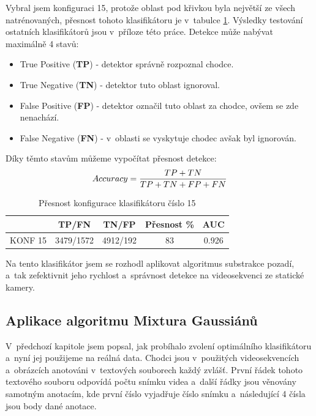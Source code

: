 Vybral jsem konfiguraci 15, protože oblast pod křivkou byla největší ze všech natrénovaných, přesnost tohoto klasifikátoru je v~tabulce \ref{classTab2}. Výsledky testování ostatních klasifikátorů jsou v~příloze této práce. Detekce může nabývat maximálně 4 stavů:
\begin{itemize}
	\item{True Positive (\textbf{TP}) - detektor správně rozpoznal chodce.}
	\item{True Negative (\textbf{TN}) - detektor tuto oblast ignoroval.}
	\item{False Positive (\textbf{FP}) - detektor označil tuto oblast za chodce, ovšem se zde nenachází.}
	\item{False Negative (\textbf{FN}) - v~oblasti se vyskytuje chodec avšak byl ignorován.}
\end{itemize}

Díky těmto stavům můžeme vypočítat přesnost detekce:
\begin{equation*}
\centering
 \label{eq:accuracy}
 \begin{aligned}
Accuracy = \frac{TP + TN}{TP + TN + FP + FN}
 \end{aligned}
\end{equation*}

\begin{table}[H]
\centering
\caption{Přesnost konfigurace klasifikátoru číslo 15}
\begin{tabular} { |c|c|c|c|c| }
\hline
{}          & {TP/FN} 	 & {TN/FP} 	& {Přesnost \%} & {AUC}  \\ \hline
KONF 15 	&  3479/1572 & 4912/192 &     83 		& 0.926  \\ \hline
\end{tabular}
\label{classTab2}
\end{table}
Na tento klasifikátor jsem se rozhodl aplikovat algoritmus substrakce pozadí, a~tak zefektivnit jeho rychlost a~správnost detekce na videosekvenci ze statické kamery.

\subsection{Aplikace algoritmu Mixtura Gaussiánů}
V~předchozí kapitole jsem popsal, jak probíhalo zvolení optimálního klasifikátoru a~nyní jej použijeme na reálná data. Chodci jsou v~použitých videosekvencích a~obrázcích anotováni v~textových souborech každý zvlášť. První řádek tohoto textového souboru odpovídá počtu snímku videa a~další řádky jsou věnovány samotným anotacím, kde první číslo vyjadřuje číslo snímku a~následující 4 čísla jsou body dané anotace.

